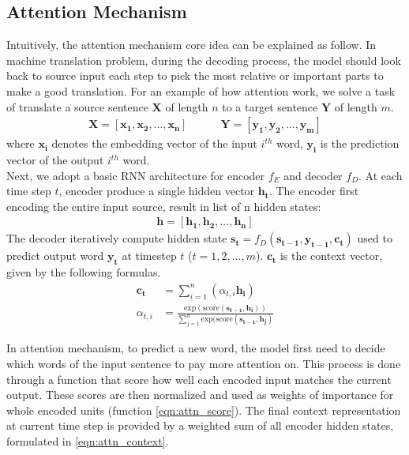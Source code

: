 \subsection{Attention Mechanism}
\label{sec:attention}
Intuitively, the attention mechanism core idea can be explained as follow. In machine translation problem, during the decoding process, the model should look back to source input each step to pick the most relative or important parts to make a good translation. 
For an example of how attention work, we solve a task of translate a source sentence $\mathbf{X}$ of length $n$ to a target sentence $\mathbf{Y}$ of length $m$. 
\begin{align*}
\mathbf{X} = [\mathbf{x_{1}}, \mathbf{x_{2}}, ..., \mathbf{x_{n}}] \quad \quad \quad
\mathbf{Y} = [\mathbf{y_{1}}, \mathbf{y_{2}}, ..., \mathbf{y_{m}}]
\end{align*}
where $\mathbf{x_{i}}$ denotes the embedding vector of the input $i^{th}$ word, $\mathbf{y_{i}}$ is the prediction vector of the output $i^{th}$ word. \\
Next, we adopt a basic RNN architecture for encoder $f_{E}$ and decoder $f_{D}$. At each time step $t$, encoder produce a single hidden vector $\mathbf{h_{t}}$.
The encoder first encoding the entire input source, result in list of n hidden states:
\begin{align*}
    \mathbf{h} = [\mathbf{h_1}, \mathbf{h_2}, ..., \mathbf{h_n}]
\end{align*}
The decoder iteratively compute hidden state $\mathbf{s_t} = f_D(\mathbf{s_{t-1}}, \mathbf{y_{t-1}}, \mathbf{c_t})$ used to predict output word $\mathbf{y_t}$ at timestep $t$ ($t = 1, 2, ..., m$). $\mathbf{c_t}$ is the context vector, given by the following formulas. 
\begin{align}
    \mathbf{c_t} &= \sum_{i=1}^{n} (\alpha_{t, i} \mathbf{h_i}) \label{eqn:attn_context} \\
    \alpha_{t, i} &= \frac{\mathrm{exp}(\mathrm{score}(\mathbf{s_{t-1}, \mathbf{h_i}}))}{\sum_{j=1}^{n}\mathrm{exp}(\mathrm{score}(\mathbf{s_{t-1}, \mathbf{h_j}})} \label{eqn:attn_score} 
\end{align}

In attention mechanism, to predict a new word, the model first need to decide which words of the input sentence to pay more attention on. This process is done through a function that score how well each encoded input matches the current output. These scores are then normalized and used as weights of importance for whole encoded units (function \ref{eqn:attn_score}). 
The final context representation at current time step is provided by a weighted sum of all encoder hidden states, formulated in \ref{eqn:attn_context}.
 
